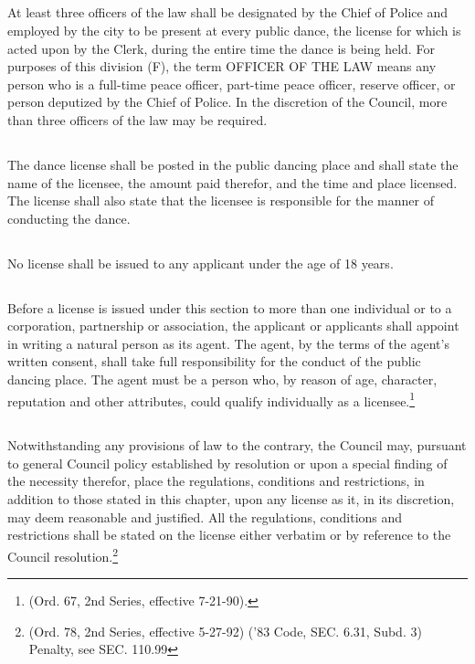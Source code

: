 \subsection{}
At least three officers of the law shall be designated by the Chief of Police and employed by the city to be present at every public dance, the license for which is acted upon by the Clerk, during the entire time the dance is being held.  For purposes of this division (F), the term OFFICER OF THE LAW means any person who is a full-time peace officer, part-time peace officer, reserve officer, or person deputized by the Chief of Police.  In the discretion of the Council, more than three officers of the law may be required.
\subsection{}
The dance license shall be posted in the public dancing place and shall state the name of the licensee, the amount paid therefor, and the time and place licensed.  The license shall also state that the licensee is responsible for the manner of conducting the dance.
\subsection{}
No license shall be issued to any applicant under the age of 18 years.
\subsection{}
Before a license is issued under this section to more than one individual or to a corporation, partnership or association, the applicant or applicants shall appoint in writing a natural person as its agent.  The agent, by the terms of the agent’s written consent, shall take full responsibility for the conduct of the public dancing place.  The agent must be a person who, by reason of age, character, reputation and other attributes, could qualify individually as a licensee.\footnote{(Ord. 67, 2nd Series, effective 7-21-90).}
\subsection{}
Notwithstanding any provisions of law to the contrary, the Council may, pursuant to general Council policy established by resolution or upon a special finding of the necessity therefor, place the regulations, conditions and restrictions, in addition to those stated in this chapter, upon any license as it, in its discretion, may deem reasonable and justified.  All the regulations, conditions and restrictions shall be stated on the license either verbatim or by reference to the Council resolution.\footnote{(Ord. 78, 2nd Series, effective 5-27-92) (’83 Code, SEC. 6.31, Subd. 3)  Penalty, see SEC. 110.99}\\

